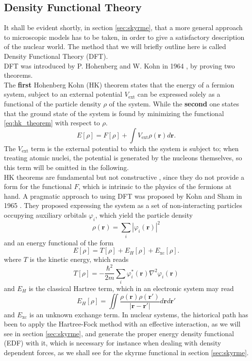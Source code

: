 \subsection{Density Functional Theory}
\label{sec:dft}
It shall be evident shortly, in section \ref{sec:skyrme}, that a more general approach to microscopic models has to be taken, in order to give a satisfactory description of the nuclear world. The method that we will briefly outline here is called Density Functional Theory (DFT).
\\DFT was introduced by P. Hohenberg and W. Kohn in 1964 \cite{HK}, by proving two theorems.
\\The \textbf{first} Hohenberg Kohn (HK) theorem states that the energy of a fermion system, subject to an external potential $V_\text{ext}$ can be expressed solely as a functional of the particle density $\rho$ of the system.
While the \textbf{second} one states that the ground state of the system is found by minimizing the functional \eqref{eq:hk_theorem} with respect to $\rho$. 
\begin{equation}
    \label{eq:hk_theorem}
    E[\rho] = F[\rho] + \int V_\text{ext} \rho(\bm r) d\mathbf r.
\end{equation}
The $V_\text{ext}$ term is the external potential to which the system is subject to; when treating atomic nuclei, the potential is generated by the nucleons themselves, so this term will be omitted in the following.
\\HK theorems are fundamental but not constructive \cite{NDFT}, since they do not provide a form for the functional $F$, which is intrinsic to the physics of the fermions at hand.
A pragmatic approach to using DFT was proposed by Kohn and Sham in 1965 \cite{KS}. They proposed expressing the system as a set of non-interacting particles occupying auxiliary orbitals $\varphi_i$, which yield the particle density
\begin{equation}
    \rho(\bm r)=\sum_i |\varphi_i(\bm r)|^2 
\end{equation}
and an energy functional of the form
\begin{equation}
    E[\rho] = T[\rho] + E_H[\rho] + E_\text{xc}[\rho].
\end{equation}
where $T$ is the kinetic energy, which reads
\begin{equation}
    \label{eq:kin_functional}
    T[\rho] = -\frac{\hbar^2}{2m}\sum_i \varphi_i ^*(\bm r)\nabla^2 \varphi_i(\bm r)
\end{equation}
and $E_H$ is the classical Hartree term, which in an electronic system may read
\begin{equation}
    E_H[\rho] = \iint \frac{\rho(\bm r)\rho(\bm r')}{|\bm r-\bm r'|} d\bm r d\bm r'
\end{equation}
and $E_\text{xc}$ is an unknown exchange term. In nuclear systems, the historical path has been to apply the Hartree-Fock method with an effective interaction, as we will see in section \ref{sec:skyrme}, and generate the proper energy density functional (EDF) with it, which is necessary for instance when dealing with density dependent forces, as we shall see for the skyrme functional in section \ref{sec:skyrme}.